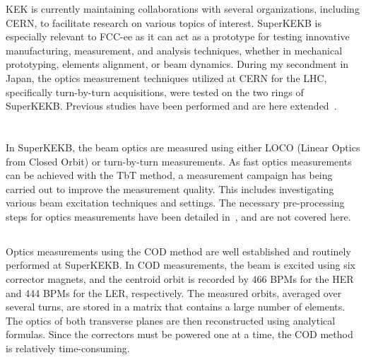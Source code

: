KEK is currently maintaining collaborations with several organizations, including CERN, to
facilitate research on various topics of interest. SuperKEKB is especially relevant to FCC-ee as it
can act as a prototype for testing innovative manufacturing, measurement, and analysis techniques,
whether in mechanical prototyping, elements alignment, or beam dynamics. During my secondment in
Japan, the optics measurement techniques utilized at CERN for the LHC, specifically turn-by-turn
acquisitions, were tested on the two rings of SuperKEKB. Previous studies have been performed and
are here extended~\cite{keintzel_jacqueline_beam_2022,keintzel_superkekb_2021,keintzel_impact_2021}.



\section{}

In SuperKEKB, the beam optics are measured using either LOCO (Linear Optics from Closed Orbit) or
turn-by-turn measurements. As fast optics measurements can be achieved with the TbT method, a measurement
campaign has being carried out to improve the measurement quality. This includes investigating
various beam excitation techniques and settings.
The necessary pre-processing steps for optics measurements have been detailed
in~\cite{keintzel_jacqueline_beam_2022}, and are not covered here.


\subsection{}

Optics measurements using the COD method \cite{harrison_global_1987,chung_measurement_1993} are well
established and routinely performed at SuperKEKB. In COD measurements, the beam is excited using six
corrector magnets, and the centroid orbit is recorded by 466 BPMs for the HER and 444 BPMs for the
LER, respectively. The measured orbits, averaged over several turns, are stored in a matrix that
contains a large number of elements. The optics of both transverse planes are then reconstructed
using analytical formulas. Since the correctors must be powered one at a time, the COD method is
relatively time-consuming. 

